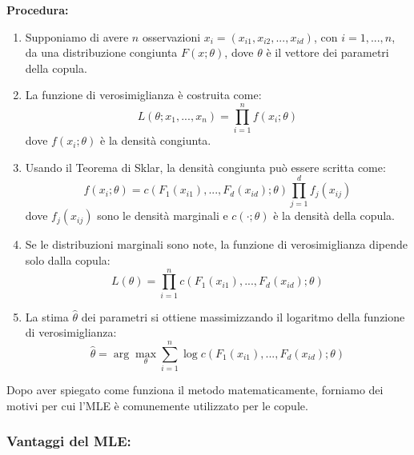 \documentclass[%
	corpo=11pt,
    twoside,
    stile=classica,
    oldstyle,
    tipotesi=custom,
    greek,
    evenboxes,
]{toptesi}
\begin{document}
\textbf{Procedura:}
\begin{enumerate}
	\item Supponiamo di avere \( n \) osservazioni \( x_i = (x_{i1}, x_{i2}, ..., x_{id}) \), con \( i = 1, ..., n \), da una distribuzione congiunta \( F(x; \theta) \), dove \( \theta \) è il vettore dei parametri della copula.
	\item La funzione di verosimiglianza è costruita come:
	\[
	L(\theta; x_1, ..., x_n) = \prod_{i=1}^{n} f(x_i; \theta)
	\]
	dove \( f(x_i; \theta) \) è la densità congiunta.
	\item Usando il Teorema di Sklar, la densità congiunta può essere scritta come:
	\[
	f(x_i; \theta) = c(F_1(x_{i1}), ..., F_d(x_{id}); \theta) \prod_{j=1}^{d} f_j(x_{ij})
	\]
	dove \( f_j(x_{ij}) \) sono le densità marginali e \( c(\cdot; \theta) \) è la densità della copula.
	\item Se le distribuzioni marginali sono note, la funzione di verosimiglianza dipende solo dalla copula:
	\[
	L(\theta) = \prod_{i=1}^{n} c(F_1(x_{i1}), ..., F_d(x_{id}); \theta)
	\]
	\item La stima \( \hat{\theta} \) dei parametri si ottiene massimizzando il logaritmo della funzione di verosimiglianza:
	\[
	\hat{\theta} = \arg \max_{\theta} \sum_{i=1}^{n} \log c(F_1(x_{i1}), ..., F_d(x_{id}); \theta)
	\]
\end{enumerate}

Dopo aver spiegato come funziona il metodo matematicamente, forniamo dei motivi per cui l'MLE è comunemente utilizzato per le copule.

\subsubsection{Vantaggi del MLE:}
\end{document}
